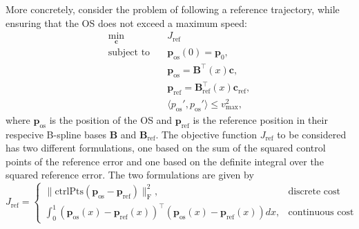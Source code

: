 More concretely, consider the problem of following a reference trajectory, while ensuring that the OS does not exceed a maximum speed:
\begin{equation}\label{eq:conservativeness-optimization}
    \begin{aligned}
        \min_{\mathbf c} \quad & J_\text{ref} \\
        \text{subject to} \quad &\mathbf p_\text{os}(0) = \mathbf p_0, \\
                     &\mathbf p_\text{os} = \mathbf B^\top(x) \mathbf c, \\
                     &\mathbf p_\text{ref} = \mathbf B_\text{ref}^\top(x) \mathbf c_\text{ref}, \\
                     &\langle p_\text{os}', p_\text{os}' \rangle \le v_\text{max}^2,
    \end{aligned}
\end{equation}
where $\mathbf p_\text{os}$ is the position of the OS and $\mathbf p_\text{ref}$ is the reference position in their respecive B-spline bases $\mathbf B$ and $\mathbf B_\text{ref}$. The objective function $J_\text{ref}$ to be considered has two different formulations, one based on the sum of the squared control points of the reference error and one based on the definite integral over the squared reference error. The two formulations are given by
\begin{equation}\label{eq:conservativeness-objective}
    J_\text{ref} = \begin{cases}
        \|\text{ctrlPts}(\mathbf p_\text{os} - \mathbf p_\text{ref})\|_\text{F}^2, & \text{discrete cost} \\
        \int_0^1 \left(\mathbf p_\text{os}(x) - \mathbf p_\text{ref}(x)\right)^\top \left(\mathbf p_\text{os}(x) - \mathbf p_\text{ref}(x)\right) dx, & \text{continuous cost}
    \end{cases}
\end{equation}

